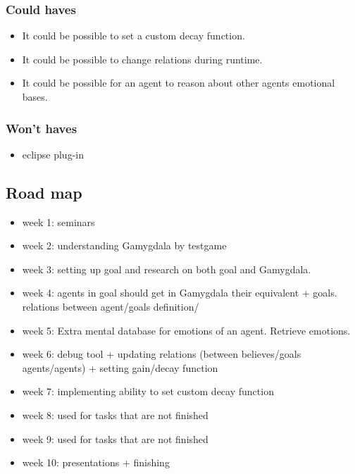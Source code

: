 \documentclass[]{article}
\begin{document}
\subsubsection*{Could haves}

\begin{itemize}
	\item It could be possible to set a custom decay function.
	\item It could be possible to change relations during runtime.
	
	\item It could be possible for an agent to reason about other agents emotional bases.
\end{itemize}

\subsubsection*{Won't haves}
\begin{itemize}
	\item eclipse plug-in
\end{itemize}

\subsection{Road map}
\begin{itemize}
	\item week 1: seminars
	\item week 2: understanding Gamygdala by testgame
	\item week 3: setting up goal and research on both goal and Gamygdala.
	\item week 4: agents in goal should get in Gamygdala their equivalent + goals. relations between agent/goals definition/
	\item week 5:  Extra mental database for emotions of an agent. Retrieve emotions.
	\item week 6: debug tool + updating relations (between believes/goals agents/agents) + setting gain/decay function
	\item week 7: implementing ability to set custom decay function
	\item week 8: used for tasks that are not finished
	\item week 9: used for tasks that are not finished
	\item week 10: presentations + finishing
	
\end{itemize}
\end{document}

